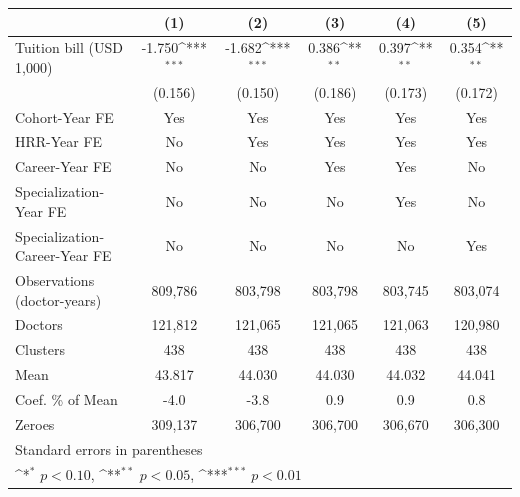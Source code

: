 {
\def\sym#1{\ifmmode^{#1}\else\(^{#1}\)\fi}
\begin{tabular}{l*{5}{c}}
\hline\hline
                    &\multicolumn{1}{c}{(1)}         &\multicolumn{1}{c}{(2)}         &\multicolumn{1}{c}{(3)}         &\multicolumn{1}{c}{(4)}         &\multicolumn{1}{c}{(5)}         \\
\hline
Tuition bill (USD 1,000)&      -1.750\sym{***}&      -1.682\sym{***}&       0.386\sym{**} &       0.397\sym{**} &       0.354\sym{**} \\
                    &     (0.156)         &     (0.150)         &     (0.186)         &     (0.173)         &     (0.172)         \\
[1em]
Cohort-Year FE      &         Yes         &         Yes         &         Yes         &         Yes         &         Yes         \\
[1em]
HRR-Year FE         &          No         &         Yes         &         Yes         &         Yes         &         Yes         \\
[1em]
Career-Year FE      &          No         &          No         &         Yes         &         Yes         &          No         \\
[1em]
Specialization-Year FE&          No         &          No         &          No         &         Yes         &          No         \\
[1em]
Specialization-Career-Year FE&          No         &          No         &          No         &          No         &         Yes         \\
\hline
Observations (doctor-years)&     809,786         &     803,798         &     803,798         &     803,745         &     803,074         \\
Doctors             &     121,812         &     121,065         &     121,065         &     121,063         &     120,980         \\
Clusters            &         438         &         438         &         438         &         438         &         438         \\
Mean                &      43.817         &      44.030         &      44.030         &      44.032         &      44.041         \\
Coef. \% of Mean    &        -4.0         &        -3.8         &         0.9         &         0.9         &         0.8         \\
Zeroes              &     309,137         &     306,700         &     306,700         &     306,670         &     306,300         \\
\hline\hline
\multicolumn{6}{l}{\footnotesize Standard errors in parentheses}\\
\multicolumn{6}{l}{\footnotesize \sym{*} \(p<0.10\), \sym{**} \(p<0.05\), \sym{***} \(p<0.01\)}\\
\end{tabular}
}
